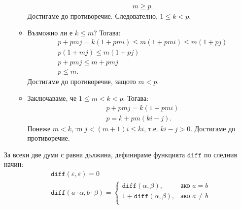 \begin{hint}
\begin{itemize}
\begin{itemize}
\begin{align*}
        & m \geq p.
      \end{align*}
      Достигаме до противоречие.
      Следователно, $1 \leq k < p$.
    \item
      Възможно ли е $k \leq m$? Тогава:
      \begin{align*}
        & p + pmj = k(1+pmi) \leq m(1+pmi) \leq m(1+pj)\\
        & p(1+mj) \leq m(1+pj)\\
        & p + pmj \leq m + pmj\\
        & p \leq m.
      \end{align*}
      Достигаме до противоречие, защото $m < p$.
    \item
      Заключаваме, че $1 \leq m < k < p$. Тогава:
      \begin{align*}
        & p + pmj = k(1+pmi)\\
        & p = k + pm(ki-j).
      \end{align*}
      Понеже $m < k$, то $j < (m+1)i \leq ki$,
      т.е. $ki-j > 0$. Достигаме до противоречие.
    \end{itemize}
  \end{itemize}
\end{hint}
\fi

За всеки две думи с равна дължина, дефинираме функцията $\texttt{diff}$ по следния начин:
\begin{align*}
  & \texttt{diff}(\varepsilon,\varepsilon) = 0\\
  & \texttt{diff}(a \cdot \alpha, b\cdot \beta) =
    \begin{cases}
      \texttt{diff}(\alpha,\beta), & \text{ако }a = b\\
      1 + \texttt{diff}(\alpha,\beta), & \text{ако }a \neq b\\
    \end{cases}
\end{align*}

